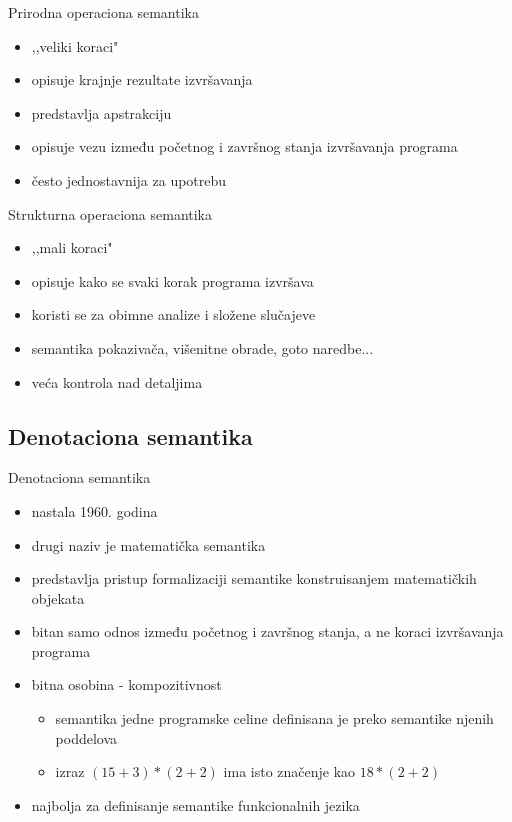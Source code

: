 \documentclass{beamer}
\begin{document}
\begin{frame}{Prirodna operaciona semantika}
	\begin{itemize}
 	\item ,,veliki koraci"
 	\item {\color{magenta} opisuje krajnje rezultate izvršavanja}
 	\item predstavlja apstrakciju
 	\item opisuje vezu između početnog i završnog stanja izvršavanja programa
 	\item često jednostavnija za upotrebu
 	\end{itemize}
\end{frame}

\begin{frame}{Strukturna operaciona semantika}
\begin{itemize}
	\item ,,mali koraci"
	\item  {\color{magenta} opisuje kako se svaki korak programa izvršava}
	\item koristi se za obimne analize i složene slučajeve
	\item semantika pokazivača, višenitne obrade, goto naredbe...
	\item veća kontrola nad detaljima
	\end{itemize}
\end{frame}
\subsection{Denotaciona semantika}
\begin{frame}{Denotaciona semantika}
  \begin{itemize}
  \item nastala 1960. godina
  \item drugi naziv je matematička semantika
  \item {\color{magenta} predstavlja pristup formalizaciji semantike konstruisanjem matematičkih objekata }
  \item bitan samo odnos između početnog i završnog stanja, a ne koraci izvršavanja programa
   \item bitna osobina -{\color{magenta} kompozitivnost }
   \begin{itemize}
   \item semantika jedne programske celine definisana je preko semantike njenih poddelova
   \item izraz $(15 + 3) * (2 + 2)$ ima isto značenje kao $18 * (2 + 2)$
   \end{itemize}
   \item najbolja za definisanje semantike funkcionalnih jezika
   \end{itemize}
\end{frame}
\end{document}
